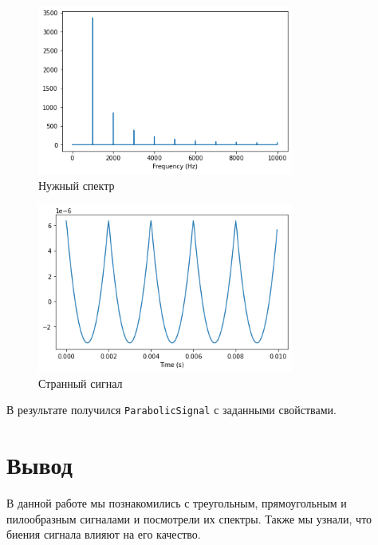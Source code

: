 \documentclass[a4paper, 12pt]{report}
\begin{document}
	\begin{figure}[H]
		\centering
		\includegraphics[width=0.75\textwidth]{test3.png}
		\caption{Нужный спектр}
		\label{fig:test3}
	\end{figure}
	\begin{figure}[H]
		\centering
		\includegraphics[width=0.75\textwidth]{test4.png}
		\caption{Странный сигнал}
		\label{fig:test4}
	\end{figure}
	В результате получился \texttt{ParabolicSignal} с заданными свойствами.
	
	\chapter{Вывод}
	В данной работе мы познакомились с треугольным, прямоугольным и пилообразным сигналами и посмотрели их спектры. Также мы узнали, что биения сигнала влияют на его качество.
\end{document}
